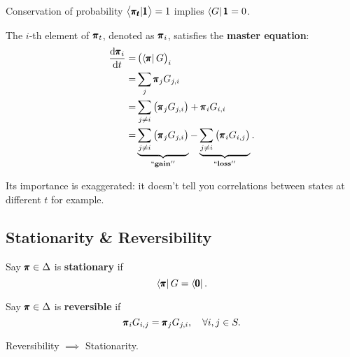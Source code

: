 \begin{corollary}
    Conservation of probability $\left< \pmb{\pi_t}|\pmb{1} \right> = 1$ implies $\left< G \right| \pmb{1} = 0$.
\end{corollary}

\begin{theorem}
    The $i$-th element of $\pmb{\pi}_t$, denoted as $\pmb{\pi}_i$, satisfies the \textbf{master equation}:
    \begin{align*}
        \frac{\dif \mbf{\pi}_i}{\dif t} = & \left(\left< \mbf{\pi} \right| G\right)_i \\ 
        = & \sum_{j} \mbf{\pi}_j G_{j, i} \\ 
        = & \sum_{j \neq i} \left( \mbf{\pi}_j G_{j, i} \right) + \mbf{\pi}_i G_{i,i} \\ 
        = & \underbrace{\sum_{j \neq i} \left( \mbf{\pi}_j G_{j, i} \right)}_{``\textbf{gain}''} - \underbrace{\sum_{j \neq i} \left( \mbf{\pi}_i G_{i, j} \right)}_{``\textbf{loss}''}.
    \end{align*}
\end{theorem}

\begin{remark}
    Its importance is exaggerated: it doesn't tell you correlations between states at different $t$ for example.
\end{remark}

\subsection{Stationarity \& Reversibility}

\begin{definition}[Stationarity]
    Say $\pmb{\pi} \in \Delta$ is \textbf{stationary} if 
    \begin{equation*}
        \left< \pmb{\pi} \right| G = \left< \pmb{0} \right|.
    \end{equation*}
\end{definition}

\begin{definition}[Reversibility]
    Say  $\pmb{\pi} \in \Delta$ is \textbf{reversible} if 
    \begin{equation*}
        \pmb{\pi}_i G_{i,j} = \pmb{\pi}_j G_{j,i}, \quad \forall i,j \in S.
    \end{equation*}
\end{definition}

\begin{proposition}
    Reversibility $\implies$ Stationarity.
\end{proposition}

